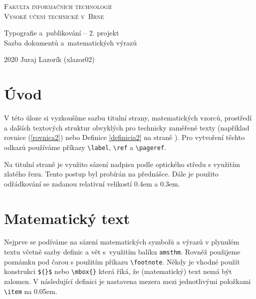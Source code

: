 \documentclass[a4paper, 11pt, twocolumn, hidelinks]{article}
\theoremstyle{definition}
\begin{document}
\begin{titlepage}

\begin{center}
{\Huge
\textsc{Fakulta informačních technologií \\[0.4em]
        Vysoké učení technické v~Brne}}
			

{\LARGE
Typografie a~publikování -- 2. projekt \\[0.3em]
Sazba dokumentů a~matematických výrazů
}

\end{center}
{\LARGE 2020 \hfill
Juraj Lazorík (xlazor02)}
\end{titlepage}

\section*{Úvod}

V této úloze si vyzkoušíme sazbu titulní strany, matematic\-kých vzorců, prostředí a dalších textových struktur obvyklých pro technicky zaměřené texty (například rovnice (\ref{rovnica2}) nebo Definice \ref{definicia2} na straně \pageref{definicia2}). Pro vytvoření těchto odkazů
používáme příkazy \verb|\label|, \verb|\ref| a \verb|\pageref|.

Na titulní straně je využito sázení nadpisu podle op\-tického středu s využitím zlatého řezu. Tento postup byl probírán na přednášce. Dále je použito odřádkování se zadanou relativní velikostí 0.4em a 0.3em.

\section{Matematický text}

Nejprve se podíváme na sázení matematických symbolů a výrazů v plynulém textu včetně sazby definic a vět s~vy\-užitím balíku \texttt{amsthm}. Rovněž použijeme poznámku pod čarou s použitím příkazu \verb|\footnote|. Někdy je vhodné použít konstrukci \verb|${}$| nebo \verb|\mbox{}| která říká, že (matematický) text nemá být zalomen. V následující de\-finici je nastavena mezera mezi jednotlivými položkami \verb|\item| na 0.05em.
\end{document}
